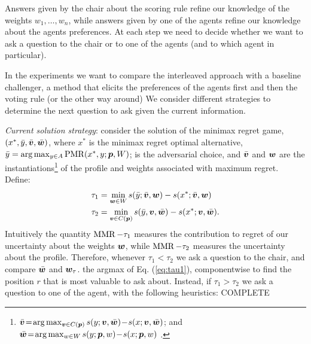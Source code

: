 Answers given by the chair about the scoring rule refine our knowledge of the weights $w_1,\ldots,w_n$, while
answers given by one of the agents refine our knowledge about the agents preferences.
At each step we need to decide whether we want to ask a question to the chair or to one of the agents (and to which agent in particular). 

In the experiments we want to compare the interleaved approach with a baseline challenger, a method  that elicits the preferences of the agents first and then the voting rule (or the other way around)
We consider different strategies to determine the next question to ask given the current information.

\medskip \noindent
{\em Current solution strategy}: consider the solution of the minimax regret game, 
 $(x^{*},\bar{y},\bar{\bm{v}},\bar{\bm{w}})$, where $x^{*}$ is the minimax regret optimal alternative,  $\bar{y} = \arg \max_{y \in A} \operatorname{PMR}(x^{*},y; {\bm{p}}, W)$; is the adversarial choice, and $\bar{\bm{v}}$ and $\bm{w}$ are the instantiations\footnote{ $\bar{\bm{v}} \!=\! \arg \max_{\bm{v} \in C({\bm{p}})} s(y; \bm{v}, \bar{\bm{w}}) \!-\! s(x; \bm{v}, \bar{\bm{w}})$; and $\bar{\bm{w}} \!=\! \arg \max_{w \in W} s(y; {\bm{p}}, w) \!-\! s(x; {\bm{p}}, w)$ .} of the profile and weights associated with maximum regret.
Define: 
\begin{align}
\tau_{1} & = \min_{\bm{w} \in W} s(\bar{y}; \bar{\bm{v}}, \bm{w}) - s(x^{*}; \bar{\bm{v}}, \bm{w})  \label{eq:tau1} \\
\tau_{2} & = \min_{\bm{v} \in C({\bm{p}})} s(\bar{y},\bm{v}, \bar{\bm{w}}) -  s(x^{*}; \bm{v}, \bar{\bm{w}}).
\end{align}
Intuitively the quantity $\operatorname{MMR} - \tau_{1} $ measures the contribution to regret of our uncertainty about the weights $\bm{w}$, while $\operatorname{MMR} - \tau_{2} $ measures the uncertainty about the profile.
Therefore, whenever $\tau_{1} < \tau_{2}$ we ask a question to the chair, and compare $\bar{\bm{w}}$ and $\bm{w}_{\tau}$. the argmax of Eq. (\ref{eq:tau1}), componentwise to find the position $r$ that is most valuable to ask about.  
Instead, if $\tau_{1} > \tau_{2}$ we ask a question to one of the agent, with the following heuristics: COMPLETE
 
